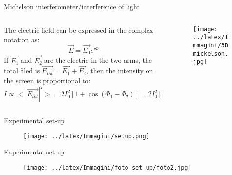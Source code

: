 \documentclass[handout]{beamer}
\theoremstyle{plain}
\theoremstyle{remark}
\theoremstyle{definition}
\begin{document}
  \begin{frame}{Michelson interferometer/interference of light}

    \begin{columns}
      \begin{column}{0.5\textwidth}
        The electric field can be expressed in the complex notation as:
        \begin{equation*}
          \vec{E}=\vec{E_0}e^{i\Phi}
        \end{equation*}
      If $\vec{E_1}$ and $\vec{E_2}$ are the electric in the two arms, the total 
        filed is $\vec{E_{tot}}=\vec{E_1}+\vec{E_2}$, then the intensity on the screen is proportional to:
        \begin{equation*}
          I\propto<|\vec{E_{tot}}|^2>=2 I_0^2 [ 1+ \cos (\Phi_1-\Phi_2) ]=2 I_0^2 [ 1+ \cos(k\Delta z)]
        \end{equation*}

 
      \end{column}

      \begin{column}{0.5\textwidth}
        \begin{figure}[h!]
          \centering
          \texttt{[image: ../latex/Immagini/3Dmickelson.jpg]}
        \end{figure}
      \end{column}
    \end{columns}
   
  \end{frame}
  \begin{frame}{Experimental set-up}
  \vspace{-10pt}
    \begin{figure}[h!]
      \centering
          \centering
          \texttt{[image: ../latex/Immagini/setup.png]}
  \end{figure}
  \end{frame}
    \begin{frame}{Experimental set-up}
      \begin{figure}[h!]
        \centering
        \texttt{[image: ../latex/Immagini/foto set up/foto2.jpg]}
      \end{figure}
    \end{frame}
\end{document}
